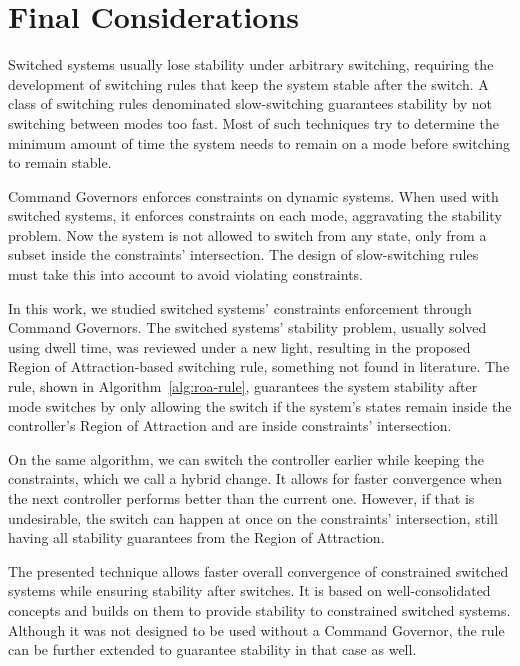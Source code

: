 
\chapter{Final Considerations}%
\label{chp:final-considerations}

Switched systems usually lose stability under arbitrary switching, requiring the
development of switching rules that keep the system stable after the switch. A
class of switching rules denominated slow-switching guarantees stability by not
switching between modes too fast. Most of such techniques try to determine the
minimum amount of time the system needs to remain on a mode before switching to
remain stable.

Command Governors enforces constraints on dynamic systems. When used with
switched systems, it enforces constraints on each mode, aggravating the
stability problem. Now the system is not allowed to switch from any state, only
from a subset inside the constraints' intersection. The design of slow-switching
rules must take this into account to avoid violating constraints.

In this work, we studied switched systems' constraints enforcement through
Command Governors. The switched systems' stability problem, usually solved using
dwell time, was reviewed under a new light, resulting in the proposed Region of
Attraction-based switching rule, something not found in literature. The rule,
shown in Algorithm~\ref{alg:roa-rule}, guarantees the system stability after
mode switches by only allowing the switch if the system's states remain inside
the controller's Region of Attraction and are inside constraints' intersection.

On the same algorithm, we can switch the controller earlier while keeping the
constraints, which we call a hybrid change. It allows for faster convergence
when the next controller performs better than the current one. However, if that
is undesirable, the switch can happen at once on the constraints' intersection,
still having all stability guarantees from the Region of Attraction.

The presented technique allows faster overall convergence of constrained
switched systems while ensuring stability after switches. It is based on
well-consolidated concepts and builds on them to provide stability to
constrained switched systems. Although it was not designed to be used without a
Command Governor, the rule can be further extended to guarantee stability in
that case as well.

